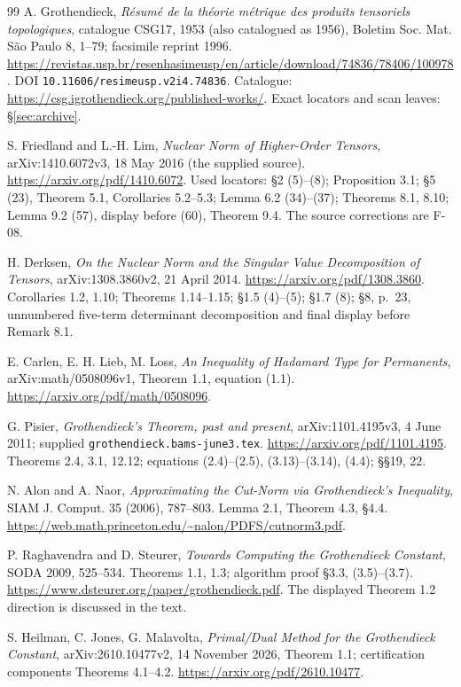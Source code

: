 \documentclass[11pt]{article}
\begin{document}
\begin{thebibliography}{99}
A. Grothendieck, \emph{R\'esum\'e de la th\'eorie m\'etrique
des produits tensoriels topologiques}, catalogue CSG17,
1953 (also catalogued as 1956), Boletim Soc. Mat. S\~ao Paulo
8, 1--79; facsimile reprint 1996.
\url{https://revistas.usp.br/resenhasimeusp/en/article/download/74836/78406/100978}.
DOI \texttt{10.11606/resimeusp.v2i4.74836}.
Catalogue: \url{https://csg.igrothendieck.org/published-works/}.
Exact locators and scan leaves: \S\ref{sec:archive}.

S. Friedland and L.-H. Lim, \emph{Nuclear Norm of Higher-Order Tensors},
arXiv:1410.6072v3, 18 May 2016 (the supplied source).
\url{https://arxiv.org/pdf/1410.6072}.
Used locators: \S2 (5)--(8); Proposition 3.1; \S5 (23),
Theorem 5.1, Corollaries 5.2--5.3; Lemma 6.2 (34)--(37);
Theorems 8.1, 8.10; Lemma 9.2 (57), display before (60),
Theorem 9.4. The source corrections are F-08.

H. Derksen, \emph{On the Nuclear Norm and the Singular Value
Decomposition of Tensors}, arXiv:1308.3860v2, 21 April 2014.
\url{https://arxiv.org/pdf/1308.3860}.
Corollaries 1.2, 1.10; Theorems 1.14--1.15; \S1.5 (4)--(5);
\S1.7 (8); \S8, p.~23, unnumbered five-term determinant
decomposition and final display before Remark 8.1.

E. Carlen, E. H. Lieb, M. Loss,
\emph{An Inequality of Hadamard Type for Permanents},
arXiv:math/0508096v1, Theorem 1.1, equation (1.1).
\url{https://arxiv.org/pdf/math/0508096}.

G. Pisier, \emph{Grothendieck's Theorem, past and present},
arXiv:1101.4195v3, 4 June 2011; supplied
\texttt{grothendieck.bams-june3.tex}.
\url{https://arxiv.org/pdf/1101.4195}.
Theorems 2.4, 3.1, 12.12; equations (2.4)--(2.5),
(3.13)--(3.14), (4.4); \S\S19, 22.

N. Alon and A. Naor, \emph{Approximating the Cut-Norm via
Grothendieck's Inequality}, SIAM J. Comput. 35 (2006), 787--803.
Lemma 2.1, Theorem 4.3, \S4.4.
\url{https://web.math.princeton.edu/~nalon/PDFS/cutnorm3.pdf}.

P. Raghavendra and D. Steurer, \emph{Towards Computing the
Grothendieck Constant}, SODA 2009, 525--534.
Theorems 1.1, 1.3; algorithm proof \S3.3, (3.5)--(3.7).
\url{https://www.dsteurer.org/paper/grothendieck.pdf}.
The displayed Theorem 1.2 direction is discussed in the text.

S. Heilman, C. Jones, G. Malavolta,
\emph{Primal/Dual Method for the Grothendieck Constant},
arXiv:2610.10477v2, 14 November 2026, Theorem 1.1;
certification components Theorems 4.1--4.2.
\url{https://arxiv.org/pdf/2610.10477}.


\end{thebibliography}
\end{document}
